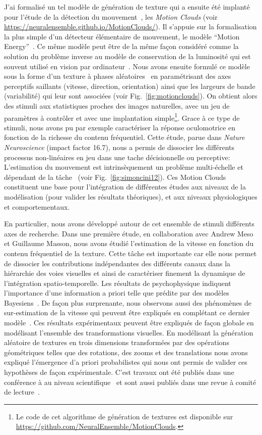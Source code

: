 \documentclass[11pt,french,a4paper,oneside]{article}%
\begin{document}
J'ai formalisé un tel modèle de génération de texture qui a ensuite été implanté pour l'étude de la détection du mouvement~\citep{Sanz12}, les \emph{Motion Clouds} (voir \url{https://neuralensemble.github.io/MotionClouds/}). Il s'appuie sur la formalisation la plus simple d'un détecteur élémentaire de mouvement, le modèle ``Motion Energy''~\citep{Adelson85}. Ce même modèle peut être de la même façon considéré comme la solution du problème inverse au modèle de conservation de la luminosité qui est souvent utilisé en vision par ordinateur~\citep{Aubert00}. Nous avons ensuite formulé ce modèle sous la forme d'un texture à phases aléatoires~\citep{Galerne10} en paramétrisant des axes perceptifs saillants (vitesse, direction, orientation) ainsi que les largeurs de bande (variabilité) qui leur sont associées (voir Fig.~\ref{fig:motionclouds}). On obtient alors des stimuli aux statistiques proches des images naturelles, avec un jeu de paramètres à contrôler et avec une implantation simple\footnote{Le code de cet algorithme de génération de textures est disponible sur \url{https://github.com/NeuralEnsemble/MotionClouds}.}. Grace à ce type de stimuli, nous avons pu par exemple caractériser la réponse oculomotrice en fonction de la richesse du contenu fréquentiel. Cette étude, parue dans \emph{Nature Neuroscience} (impact factor 16.7), nous a permis de dissocier les différents processus non-linéaires en jeu dans une tache décisionnelle ou perceptive: L'estimation du mouvement est intrinsèquement un problème multi-échelle et dépendant de la tâche~\citep{Simoncini12} (voir Fig.~\ref{fig:simoncini12}). Ces Motion Clouds constituent une base pour l'intégration de différentes études aux niveaux de la modélisation (pour valider les résultats théoriques), et aux niveaux physiologiques et comportementaux. %

En particulier, nous avons développé autour de cet ensemble de stimuli différents axes de recherche. Dans une première étude, en collaboration avec Andrew Meso et Guillaume Masson, nous avons étudié l'estimation de la vitesse en fonction du contenu fréquentiel de la texture. Cette tâche est importante car elle nous permet de dissocier les contributions indépendantes des différents canaux dans la hiérarchie des voies visuelles et ainsi de caractériser finement la dynamique de l'intégration spatio-temporelle. Les résultats de psychophysique indiquent l'importance d'une information a priori telle que prédite par des modèles Bayesiens~\citep{Stocker06}. De façon plus surprenante, nous observons aussi des phénomènes de sur-estimation de la vitesse qui peuvent être expliqués en complétant ce dernier modèle~\citep{Meso13vss,Meso14vss,Vacher15nips}. Ces résultats expérimentaux peuvent être expliqués de façon globale en modélisant l'ensemble des transformations visuelles.
En modélisant la génération aléatoire de  textures en trois dimensions transformées par des opérations géométriques telles que des rotations, des zooms et des translations nous avons expliqué l'émergence d'a priori probabilistes qui nous ont permis de valider ces hypothèses de façon expérimentale. C'est travaux ont été publiés dans une conférence à au niveau scientifique~\citep{Vacher15nips} et sont aussi publiés dans une revue à comité de lecture~\citep{Vacher16}.
\end{document}
